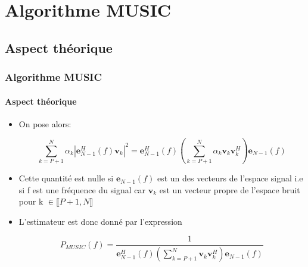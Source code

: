 \documentclass[10pt]{beamer}
\begin{document}
    

    \section{Algorithme MUSIC}
    \subsection{Aspect théorique} 
    

    \begin{frame}
    
        \frametitle{Algorithme MUSIC}
        \framesubtitle{Aspect théorique}
        
        \begin{itemize}
        
        \item On pose alors:
        
        { \fontsize{8.5}{10}\selectfont
        
        \begin{equation}
%
        \label{eq:basemusic}
        \sum_{k=P+1}^{N} \alpha _k \left| \boldsymbol{e}_{N-1}^H (f) \boldsymbol{v}_k \right| ^2 = \boldsymbol{e}_{N-1}^H (f) \left( \sum_{k=P+1}^{N} \alpha _k  \boldsymbol{v}_{k}\boldsymbol{v}_k^H \right) \boldsymbol{e}_{N-1} (f)
%
        \end{equation}
        }
        
        \item Cette quantité est nulle si \(\boldsymbol{e}_{N-1}(f)\) est un des vecteurs de l'espace signal i.e si f est une fréquence du signal car \(\boldsymbol{v}_k \) est un vecteur propre de l'espace bruit pour k \( \in \llbracket P+1,N \rrbracket \)
        
        \item L'estimateur est donc donné par l'expression

        \begin{equation}
            \label{eq:music}
            P_{MUSIC} (f) = \frac{1}{\boldsymbol{e}_{N-1}^H (f) \left( \sum_{k=P+1}^{N}   \boldsymbol{v}_{k}\boldsymbol{v}_k^H \right) \boldsymbol{e}_{N-1} (f)}
        \end{equation}
        
        \end{itemize}
    \end{frame}
    
\end{document}
